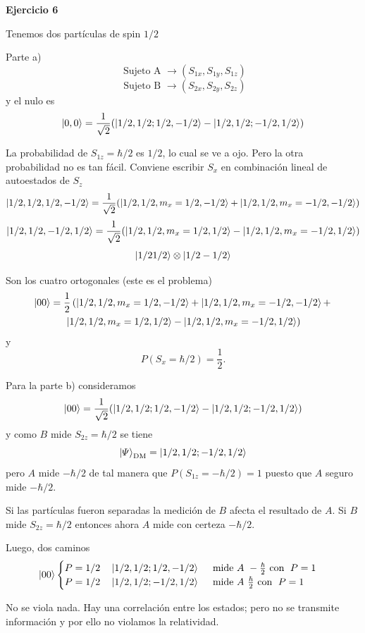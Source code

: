 \documentclass[10pt,oneside]{CBFT_book}
\begin{document}
\begin{ejemplo}{\bf Ejercicio 6}
 
Tenemos dos partículas de spin $1/2$ 

Parte a)
\[
	\text{ Sujeto A } \longrightarrow (S_{1x}, S_{1y}, S_{1z})
\]
\[
	\text{ Sujeto B } \longrightarrow (S_{2x}, S_{2y}, S_{2z})
\] 
y el nulo es
\[
	\Ket{0,0} = \frac{1}{\sqrt{2}} ( \Ket{ 1/2, 1/2 ; 1/2, -1/2 } - \Ket{ 1/2, 1/2 ; -1/2, 1/2 })
\]

La probabilidad de $S_{1z} = \hbar/2$ es $1/2$, lo cual se ve a ojo.
Pero la otra probabilidad no es tan fácil. Conviene escribir $S_x$ en combinación lineal de
autoestados de $S_z$
\[
	\Ket{1/2, 1/2, 1/2, -1/2} = \frac{1}{\sqrt{2}}
	( \Ket{ 1/2, 1/2, m_x = 1/2, -1/2 } + \Ket{ 1/2, 1/2, m_x = -1/2, -1/2 } )
\]
\[
	\Ket{1/2, 1/2, -1/2, 1/2} = \frac{1}{\sqrt{2}}
	( \Ket{ 1/2, 1/2, m_x = 1/2, 1/2 } - \Ket{ 1/2, 1/2, m_x = -1/2, 1/2 } )
\]
\[
	\Ket{ 1/2 1/2 } \otimes \Ket{ 1/2 -1/2 }
\]

Son los cuatro ortogonales (este es el problema)
\begin{multline*}
	\Ket{ 0  0 } = \frac{1}{2}
	\left( \Ket{ 1/2, 1/2, m_x = 1/2, -1/2 } +
	\Ket{ 1/2, 1/2, m_x = -1/2, -1/2 } + \right. \\
	\left. \Ket{ 1/2, 1/2, m_x = 1/2, 1/2 } -
	\Ket{ 1/2, 1/2, m_x = -1/2, 1/2 }
	\right) 
\end{multline*}
y
\[
	P( S_x = \hbar/2 ) = \frac{1}{2}.
\]

Para la parte b) consideramos
\[
	\Ket{ 0 0 } = \frac{1}{\sqrt{2}} 
	( \Ket{1/2, 1/2 ; 1/2, -1/2} - \Ket{1/2, 1/2 ; -1/2, 1/2} )
\]
y como $B$ mide $S_{2z} = \hbar/2$ se tiene
\[
	\Ket{\Psi}_{\text{DM}} = \Ket{1/2, 1/2 ; -1/2, 1/2}
\]
pero $A$ mide $-\hbar/2$ de tal manera que $P(S_{1z}=-\hbar/2)=1$ puesto que $A$ seguro
mide $-\hbar/2$.

Si las partículas fueron separadas la medición de $B$ afecta el resultado de $A$.
Si $B$ mide $S_{2z}=\hbar/2$ entonces ahora $A$ mide con certeza $-\hbar/2$.

Luego, dos caminos
\[
	\Ket{00} 
	\begin{cases}
	P=1/2 \quad \Ket{1/2, 1/2 ; 1/2, -1/2} \quad \text{ mide $A$ } -\frac{\hbar}{2} \text{ con } \; P=1 \\
	P=1/2 \quad \Ket{1/2, 1/2 ; -1/2, 1/2} \quad \text{ mide $A$ } \frac{\hbar}{2} \text{ con } \; P=1
	\end{cases}
\]

No se viola nada. Hay una correlación entre los estados; pero no se transmite información
y por ello no violamos la relatividad.

\end{ejemplo}
\end{document}
